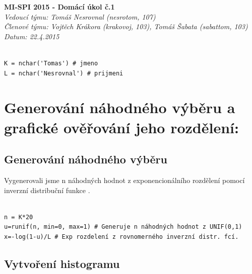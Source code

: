 \documentclass[12pt]{article}
\begin{document}
\sffamily\fontsize{26}{15}\color{MSBlue}\textbf{MI-SPI 2015 - Domácí úkol č.1}\\
\color{MSBlue}\underline{\hspace{17cm}}
\sffamily\fontsize{12}{15}\color{MSBlue}\textit{Vedoucí týmu: Tomáš Nesrovnal (nesrotom, 107)}\\
\sffamily\fontsize{12}{15}\color{MSBlue}\textit{Členové týmu: Vojtěch Krákora (krakovoj, 103), Tomáš Šabata (sabattom, 103)}\\
\sffamily\fontsize{12}{15}\color{MSBlue}\textit{Datum: 22.4.2015}\\
  \begin{lstlisting}[frame=single]  % Start your code-block

K = nchar('Tomas') # jmeno
L = nchar('Nesrovnal') # prijmeni
\end{lstlisting}
\section{Generování náhodného výběru a grafické ověřování jeho rozdělení:}
\subsection{Generování náhodného výběru}
\begin{footnotesize}
\color{black}
Vygenerovali jsme n náhodných hodnot z exponencionálního rozdělení pomocí inverzní distribuční funkce \cite{wiki}.
\end{footnotesize}

  \begin{lstlisting}[frame=single]  % Start your code-block
  
n = K*20
u=runif(n, min=0, max=1) # Generuje n náhodných hodnot z UNIF(0,1)
x=-log(1-u)/L # Exp rozdelení z rovnomerného inverzní distr. fcí.
\end{lstlisting}
\subsection{Vytvoření histogramu}
\end{document}
